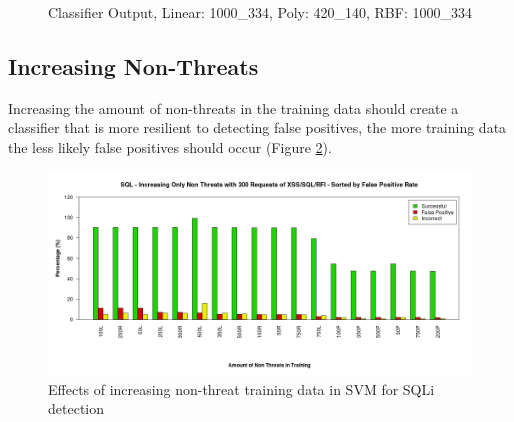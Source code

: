 \begin{figure}[hb]
	\centering
	\caption{Classifier Output, Linear: 1000\_334, Poly: 420\_140, RBF: 1000\_334}
	\label{fig:resClassifiers}
\end{figure}

\newpage
\subsection{Increasing Non-Threats}

Increasing the amount of non-threats in the training data should create a classifier that is more resilient to detecting false positives, the more training data the less likely false positives should occur (Figure \ref{fig:resFalse}).

\begin{figure}[hb]
	\centering
	\includegraphics[width=450px]{./assets/results/svm/nonthreat/Results_SQL.png}
	\caption{Effects of increasing non-threat training data in SVM for SQLi detection}
	\label{fig:resFalse}
\end{figure}

